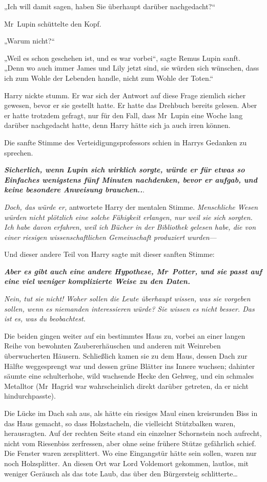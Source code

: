 {„Ich will damit sagen, haben Sie überhaupt darüber nachgedacht?“

Mr~Lupin schüttelte den Kopf.

„Warum nicht?“

„Weil es schon geschehen ist, und es war vorbei“, sagte Remus Lupin sanft. „Denn wo auch immer James und Lily jetzt sind, sie würden sich wünschen, dass ich zum Wohle der Lebenden handle, nicht zum Wohle der Toten.“

Harry nickte stumm. Er war sich der Antwort auf diese Frage ziemlich sicher gewesen, bevor er sie gestellt hatte. Er hatte das Drehbuch bereits gelesen. Aber er hatte trotzdem gefragt, nur für den Fall, dass Mr~Lupin eine Woche lang darüber nachgedacht hatte, denn Harry hätte sich ja auch irren können.

Die sanfte Stimme des Verteidigungsprofessors schien in Harrys Gedanken zu sprechen.

\textbf{\emph{Sicherlich, wenn Lupin sich wirklich sorgte, würde er für etwas so Einfaches wenigstens fünf Minuten nachdenken, bevor er aufgab, und keine besondere Anweisung brauchen..}}.

\emph{Doch, das würde er,} antwortete Harry der mentalen Stimme. \emph{Menschliche Wesen würden nicht plötzlich eine solche Fähigkeit erlangen, nur weil sie sich sorgten. Ich habe davon erfahren, weil ich Bücher in der Bibliothek gelesen habe, die von einer riesigen wissenschaftlichen Gemeinschaft produziert wurden}—

Und dieser andere Teil von Harry sagte mit dieser sanften Stimme:

\textbf{\emph{Aber es gibt auch eine andere Hypothese, Mr~Potter, und sie passt auf eine viel weniger komplizierte Weise zu den Daten.}}

\emph{Nein, tut sie nicht! Woher sollen die Leute überhaupt wissen, was sie vorgeben sollen, wenn es niemanden interessieren würde? Sie wissen es nicht besser. Das ist es, was du beobachtest.}

Die beiden gingen weiter auf ein bestimmtes Haus zu, vorbei an einer langen Reihe von bewohnten Zaubererhäuschen und anderen mit Weinreben überwucherten Häusern. Schließlich kamen sie zu dem Haus, dessen Dach zur Hälfte weggesprengt war und dessen grüne Blätter ins Innere wuchsen; dahinter säumte eine schulterhohe, wild wachsende Hecke den Gehweg, und ein schmales Metalltor (Mr~Hagrid war wahrscheinlich direkt darüber getreten, da er nicht hindurchpasste).

Die Lücke im Dach sah aus, als hätte ein riesiges Maul einen kreisrunden Biss in das Haus gemacht, so dass Holzstacheln, die vielleicht Stützbalken waren, herausragten. Auf der rechten Seite stand ein einzelner Schornstein noch aufrecht, nicht vom Riesenbiss zerfressen, aber ohne seine frühere Stütze gefährlich schief. Die Fenster waren zersplittert. Wo eine Eingangstür hätte sein sollen, waren nur noch Holzsplitter. An diesen Ort war Lord Voldemort gekommen, lautlos, mit weniger Geräusch als das tote Laub, das über den Bürgersteig schlitterte…

}
